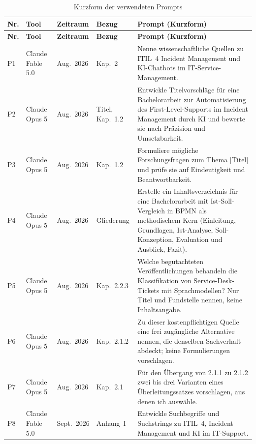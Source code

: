 {\small
\renewcommand{\arraystretch}{1.15}
\begin{longtable}{|>{\raggedright\arraybackslash}p{0.75cm}|>{\raggedright\arraybackslash}p{2.05cm}|>{\raggedright\arraybackslash}p{1.8cm}|>{\raggedright\arraybackslash}p{2.3cm}|>{\raggedright\arraybackslash}p{5.75cm}|}
	\caption{Kurzform der verwendeten Prompts}\label{tab:prompts}\\
	\hline
	\textbf{Nr.} & \textbf{Tool} & \textbf{Zeitraum} & \textbf{Bezug} & \textbf{Prompt (Kurzform)} \\
	\hline
	\endfirsthead
	\hline
	\textbf{Nr.} & \textbf{Tool} & \textbf{Zeitraum} & \textbf{Bezug} & \textbf{Prompt (Kurzform)} \\
	\hline
	\endhead
	\hline
	\endfoot
	P1 & Claude Fable 5.0 & Aug.~2026 & Kap.~2 & Nenne wissenschaftliche Quellen zu ITIL~4 Incident Management und KI-Chatbots im IT-Service-Management. \\ \hline
	P2 & Claude Opus 5 & Aug.~2026 & Titel, Kap.~1.2 & Entwickle Titelvorschl\"age f\"ur eine Bachelorarbeit zur Automatisierung des First-Level-Supports im Incident Management durch KI und bewerte sie nach Pr\"azision und Umsetzbarkeit. \\ \hline
	P3 & Claude Opus 5 & Aug.~2026 & Kap.~1.2 & Formuliere m\"ogliche Forschungsfragen zum Thema [Titel] und pr\"ufe sie auf Eindeutigkeit und Beantwortbarkeit. \\ \hline
	P4 & Claude Opus 5 & Aug.~2026 & Gliederung & Erstelle ein Inhaltsverzeichnis f\"ur eine Bachelorarbeit mit Ist-Soll-Vergleich in BPMN als methodischem Kern (Einleitung, Grundlagen, Ist-Analyse, Soll-Konzeption, Evaluation und Ausblick, Fazit). \\ \hline
	P5 & Claude Opus 5 & Aug.~2026 & Kap.~2.2.3 & Welche begutachteten Ver\"offentlichungen behandeln die Klassifikation von Service-Desk-Tickets mit Sprachmodellen? Nur Titel und Fundstelle nennen, keine Inhaltsangabe. \\ \hline
	P6 & Claude Opus 5 & Aug.~2026 & Kap.~2.1.2 & Zu dieser kostenpflichtigen Quelle eine frei zug\"angliche Alternative nennen, die denselben Sachverhalt abdeckt; keine Formulierungen vorschlagen. \\ \hline
	P7 & Claude Opus 5 & Aug.~2026 & Kap.~2.1 & F\"ur den \"Ubergang von 2.1.1 zu 2.1.2 zwei bis drei Varianten eines \"Uberleitungssatzes vorschlagen, aus denen ich ausw\"ahle. \\ \hline
	P8 & Claude Fable 5.0 & Sept.~2026 & Anhang~I & Entwickle Suchbegriffe und Suchstrings zu ITIL~4, Incident Management und KI im IT-Support. \\ \hline

\end{longtable}}
